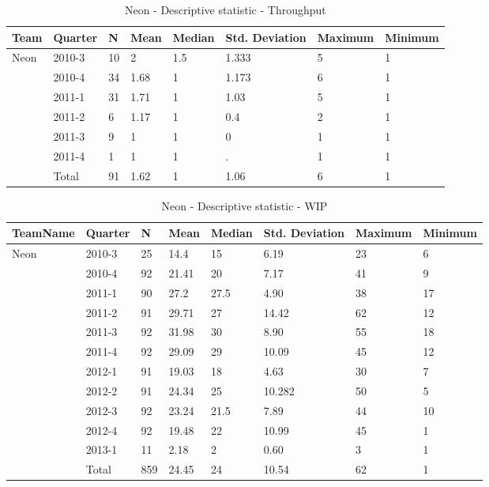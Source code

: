 \documentclass[UKenglish]{ifimaster}  %
\begin{document}
   \begin{table}[!htbp]
\begin{tabular}{ | l | l | l | l | l | l | l | l | }
\hline
Team & Quarter & N & Mean & Median & Std. Deviation & Maximum & Minimum \\ \hline
 Neon & 2010-3 & 10 & 2 & 1.5 & 1.333 & 5 & 1 \\ \hline
	 & 2010-4 & 34 & 1.68 & 1 & 1.173 & 6 & 1 \\ \hline
	 & 2011-1 & 31 & 1.71 & 1 & 1.03 & 5 & 1 \\ \hline
	 & 2011-2 & 6 & 1.17 & 1 & 0.4 & 2 & 1 \\ \hline
	 & 2011-3 & 9 & 1 & 1 & 0 & 1 & 1 \\ \hline
	 & 2011-4 & 1 & 1 & 1 & . & 1 & 1 \\ \hline
	 & Total & 91 & 1.62 & 1 & 1.06 & 6 & 1 \\ \hline
\end{tabular}
\caption{Neon - Descriptive statistic - Throughput}
\end{table}
 
\begin{table}[!htbp]
\begin{tabular}{ | l | l | l | l | l | l | l | l | }
\hline
TeamName & Quarter & N & Mean & Median & Std. Deviation & Maximum & Minimum \\ \hline
Neon & 2010-3 & 25 & 14.4 & 15 & 6.19 & 23 & 6 \\ \hline
	 & 2010-4 & 92 & 21.41 & 20 & 7.17 & 41 & 9 \\ \hline
	 & 2011-1 & 90 & 27.2 & 27.5 & 4.90 & 38 & 17 \\ \hline
	 & 2011-2 & 91 & 29.71 & 27 & 14.42 & 62 & 12 \\ \hline
	 & 2011-3 & 92 & 31.98 & 30 & 8.90 & 55 & 18 \\ \hline
	 & 2011-4 & 92 & 29.09 & 29 & 10.09 & 45 & 12 \\ \hline
	 & 2012-1 & 91 & 19.03 & 18 & 4.63 & 30 & 7 \\ \hline
	 & 2012-2 & 91 & 24.34 & 25 & 10.282 & 50 & 5 \\ \hline
	 & 2012-3 & 92 & 23.24 & 21.5 & 7.89 & 44 & 10 \\ \hline
	 & 2012-4 & 92 & 19.48 & 22 & 10.99 & 45 & 1 \\ \hline
	 & 2013-1 & 11 & 2.18& 2 & 0.60 & 3 & 1 \\ \hline
	 & Total & 859 & 24.45 & 24 & 10.54& 62 & 1 \\ \hline
\end{tabular}
\caption{Neon - Descriptive statistic - WIP}
\end{table}
\end{document}
